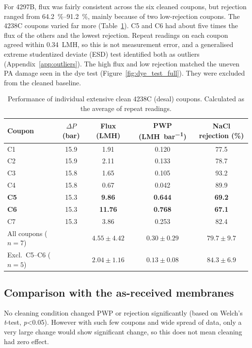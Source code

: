 For 4297B, flux was fairly consistent across the six cleaned coupons, but rejection ranged from \qtyrange{64.2}{91.2}{\percent}, mainly because of two low-rejection coupons. The 4238C coupons varied far more (Table~\ref{tab:clean-desal-coupons}). C5 and C6 had about five times the flux of the others and the lowest rejection. Repeat readings on each coupon agreed within \qty{0.34}{LMH}, so this is not measurement error, and a generalised extreme studentized deviate (ESD) test identified both as outliers (Appendix~\ref{app:outliers}). The high flux and low rejection matched the uneven PA damage seen in the dye test (Figure~\ref{fig:dye_test_full}). They were excluded from the cleaned baseline. 



\begin{table}[htbp]
  \centering
  \caption{Performance of individual extensive clean 4238C (desal) coupons.
  Calculated as the average of repeat readings.}
  \label{tab:clean-desal-coupons}
  \begin{tabular}{lcccc}
    \toprule
    Coupon & $\Delta P$ (\unit{bar}) & Flux (\unit{LMH}) & PWP (\unit{LMH.bar^{-1}}) & NaCl rejection (\%) \\
    \midrule
    C1 & 15.9 & 1.91 & 0.120 & 77.5 \\
    C2 & 15.9 & 2.11 & 0.133 & 78.7 \\
    C3 & 15.8 & 1.65 & 0.105 & 93.2 \\
    C4 & 15.8 & 0.67 & 0.042 & 89.9 \\
    \textbf{C5} & 15.3 & \textbf{9.86} & \textbf{0.644} & \textbf{69.2} \\
    \textbf{C6} & 15.3 & \textbf{11.76} & \textbf{0.768} & \textbf{67.1} \\
    C7 & 15.3 & 3.86 & 0.253 & 82.4 \\
    \midrule
    All coupons ($n = 7$)     & & $4.55 \pm 4.42$ & $0.30 \pm 0.29$ & $79.7 \pm 9.7$ \\
    Excl.\ C5--C6 ($n = 5$)   & & $2.04 \pm 1.16$ & $0.13 \pm 0.08$ & $84.3 \pm 6.9$ \\
    \bottomrule
  \end{tabular}
\end{table}

\subsection{Comparison with the as-received membranes}
 \label{sec:res-cleaning-compare}
No cleaning condition changed PWP or rejection significantly (based on Welch's \textit{t}-test, \textit{p}<0.05). However with such few coupons and wide spread of data, only a very large change would show significant change, so this does not mean cleaning had zero effect. 

